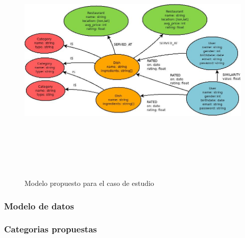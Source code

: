 \newpage
    \begin{landscape}
      \begin{figure}[h!]
      \centering
      \includegraphics[width=22.5cm,height=12cm]{./images/Modelo_datos.jpg}
      \caption{Modelo propuesto para el caso de estudio}
    \end{figure}
    \end{landscape}
  \newpage

\newpage
\subsubsection{Modelo de datos}
  

\newpage
\subsubsection{Categorias propuestas}
   
